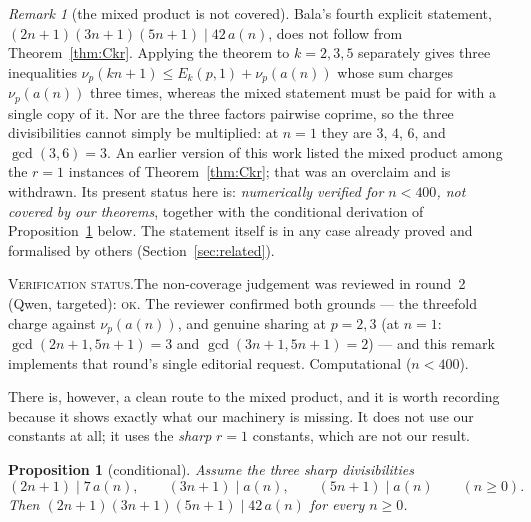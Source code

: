\documentclass[11pt]{article}
\theoremstyle{plain}
\newtheorem{proposition}[theorem]{Proposition}
\theoremstyle{definition}
\theoremstyle{remark}
\newtheorem{nremark}[theorem]{Remark}
\numberwithin{equation}{section}
\newcommand{\vstatus}[1]{%
  \par\vspace{3pt}\noindent
  {\small\textsc{Verification status.}\enspace #1}\par\vspace{3pt}}
\begin{document}
\begin{nremark}[the mixed product is not covered]
\label{rem:mixed}
Bala's fourth explicit statement, $(2n+1)(3n+1)(5n+1) \mid 42\,a(n)$, does not follow from
Theorem~\ref{thm:Ckr}. Applying the theorem to $k=2,3,5$ separately gives three inequalities
$\nu_p(kn+1) \le E_k(p,1) + \nu_p(a(n))$ whose sum charges $\nu_p(a(n))$ three times, whereas
the mixed statement must be paid for with a single copy of it. Nor are the three factors pairwise
coprime, so the three divisibilities cannot simply be multiplied: at $n=1$ they are $3$, $4$, $6$,
and $\gcd(3,6) = 3$. An earlier version of this work listed the mixed product among the $r=1$
instances of Theorem~\ref{thm:Ckr}; that was an overclaim and is withdrawn. Its present status
here is: \emph{numerically verified for $n < 400$, not covered by our theorems}, together with
the conditional derivation of Proposition~\ref{prop:mixed} below. The statement itself is in any
case already proved and formalised by others (Section~\ref{sec:related}).
\end{nremark}
\vstatus{The non-coverage judgement was reviewed in round~2 (Qwen, targeted): \textsc{ok}. The
reviewer confirmed both grounds --- the threefold charge against $\nu_p(a(n))$, and genuine
sharing at $p=2,3$ (at $n=1$: $\gcd(2n+1,5n+1)=3$ and $\gcd(3n+1,5n+1)=2$) --- and this remark
implements that round's single editorial request. Computational ($n<400$).}

There is, however, a clean route to the mixed product, and it is worth recording because it shows
exactly what our machinery is missing. It does not use our constants at all; it uses the
\emph{sharp} $r=1$ constants, which are not our result.

\begin{proposition}[conditional]
\label{prop:mixed}
Assume the three sharp divisibilities
\[
  (2n+1) \mid 7\,a(n), \qquad (3n+1) \mid a(n), \qquad (5n+1)\mid a(n) \qquad (n \ge 0).
\]
Then $(2n+1)(3n+1)(5n+1) \mid 42\,a(n)$ for every $n \ge 0$.
\end{proposition}
\end{document}
